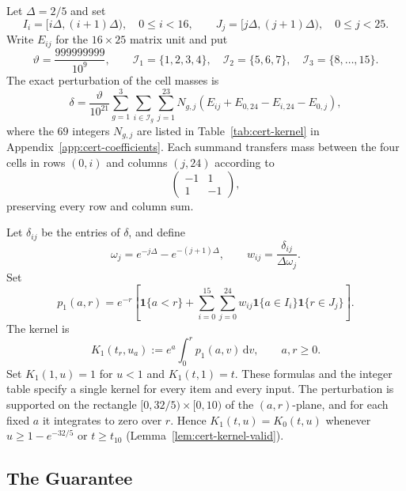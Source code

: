 \documentclass[11pt]{article}
\theoremstyle{definition}
\theoremstyle{remark}
\newcommand{\dd}{\,\mathrm d}
\newcommand{\ind}{\mathbf 1}
\begin{document}
Let $\Delta=2/5$ and set
\[
 I_i=[i\Delta,(i+1)\Delta),\quad 0\le i<16,
 \qquad J_j=[j\Delta,(j+1)\Delta),\quad 0\le j<25.
\]
Write $E_{ij}$ for the $16\times25$ matrix unit and put
\[
 \vartheta=\frac{999999999}{10^9},\qquad
 \mathcal I_1=\{1,2,3,4\},\quad
 \mathcal I_2=\{5,6,7\},\quad
 \mathcal I_3=\{8,\ldots,15\}.
\]
The exact perturbation of the cell masses is
\begin{equation}\label{eq:cert-delta}
 \delta=\frac{\vartheta}{10^{21}}
 \sum_{g=1}^3\sum_{i\in\mathcal I_g}\sum_{j=1}^{23}N_{g,j}
 (E_{ij}+E_{0,24}-E_{i,24}-E_{0,j}),
\end{equation}
where the $69$ integers $N_{g,j}$ are listed in
Table~\ref{tab:cert-kernel} in Appendix~\ref{app:cert-coefficients}.
Each summand transfers mass between the four cells in rows $(0,i)$
and columns $(j,24)$ according to
\[
 \begin{pmatrix}-1&1\\1&-1\end{pmatrix},
\]
preserving every row and column sum.

Let $\delta_{ij}$ be the entries of $\delta$, and define
\[
 \omega_j=e^{-j\Delta}-e^{-(j+1)\Delta},\qquad
 w_{ij}=\frac{\delta_{ij}}{\Delta\omega_j}.
\]
Set
\begin{equation}\label{eq:cert-p}
 p_1(a,r)=e^{-r}\left[
 \ind\{a<r\}+\sum_{i=0}^{15}\sum_{j=0}^{24}
 w_{ij}\ind\{a\in I_i\}\ind\{r\in J_j\}\right].
\end{equation}
The kernel is
\begin{equation}\label{eq:cert-K}
 K_1(t_r,u_a):=e^a\int_0^r p_1(a,v)\dd v,
 \qquad a,r\ge0.
\end{equation}
Set $K_1(1,u)=1$ for $u<1$ and $K_1(t,1)=t$.
These formulas and the integer table specify a single kernel for every
item and every input.
The perturbation is supported on the rectangle $[0,32/5)\times[0,10)$ of the $(a,r)$-plane, and for each fixed $a$ it integrates to zero over $r$.
Hence $K_1(t,u)=K_0(t,u)$ whenever $u\ge1-e^{-32/5}$ or $t\ge t_{10}$ (Lemma~\ref{lem:cert-kernel-valid}).

\subsection{\texorpdfstring{The Guarantee}{The Guarantee}}\label{sec:final-guarantee}
\end{document}

